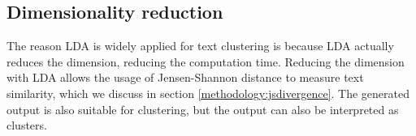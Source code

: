 \subsection{Dimensionality reduction} \label{methodology:dimreduction}
The reason LDA is widely applied for text clustering is because LDA actually reduces the dimension, reducing the computation time. Reducing the dimension with LDA allows the usage of Jensen-Shannon distance to measure text similarity, which we discuss in section \ref{methodology:jsdivergence}. The generated output is also suitable for clustering, but the output can also be interpreted as clusters.


